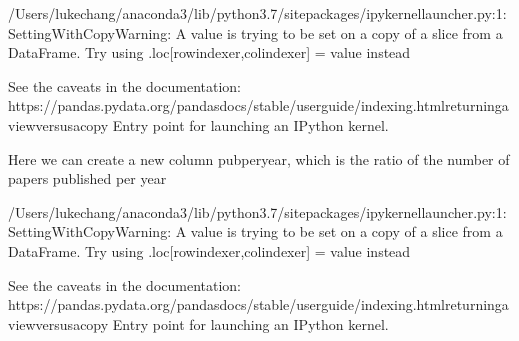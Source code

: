 \documentclass[letterpaper,10pt,english]{sphinxmanual}
\begin{document}
\begin{sphinxVerbatim}[commandchars=\\\{\}]
\PYG{p}{[}\PYG{p}{]}  
\end{sphinxVerbatim}

\begin{sphinxVerbatim}[commandchars=\\\{\}]
/Users/lukechang/anaconda3/lib/python3.7/site\PYGZhy{}packages/ipykernel\PYGZus{}launcher.py:1: SettingWithCopyWarning: 
A value is trying to be set on a copy of a slice from a DataFrame.
Try using .loc[row\PYGZus{}indexer,col\PYGZus{}indexer] = value instead

See the caveats in the documentation: https://pandas.pydata.org/pandas\PYGZhy{}docs/stable/user\PYGZus{}guide/indexing.html\PYGZsh{}returning\PYGZhy{}a\PYGZhy{}view\PYGZhy{}versus\PYGZhy{}a\PYGZhy{}copy
  \PYGZdq{}\PYGZdq{}\PYGZdq{}Entry point for launching an IPython kernel.
\end{sphinxVerbatim}

Here we can create a new column pubperyear, which is the ratio of the number of papers published per year

\begin{sphinxVerbatim}[commandchars=\\\{\}]
\PYG{p}{[}\PYG{p}{]}  \PYG{p}{[}\PYG{p}{]}\PYG{p}{[}\PYG{p}{]}
\end{sphinxVerbatim}

\begin{sphinxVerbatim}[commandchars=\\\{\}]
/Users/lukechang/anaconda3/lib/python3.7/site\PYGZhy{}packages/ipykernel\PYGZus{}launcher.py:1: SettingWithCopyWarning: 
A value is trying to be set on a copy of a slice from a DataFrame.
Try using .loc[row\PYGZus{}indexer,col\PYGZus{}indexer] = value instead

See the caveats in the documentation: https://pandas.pydata.org/pandas\PYGZhy{}docs/stable/user\PYGZus{}guide/indexing.html\PYGZsh{}returning\PYGZhy{}a\PYGZhy{}view\PYGZhy{}versus\PYGZhy{}a\PYGZhy{}copy
  \PYGZdq{}\PYGZdq{}\PYGZdq{}Entry point for launching an IPython kernel.
\end{sphinxVerbatim}
\end{document}
